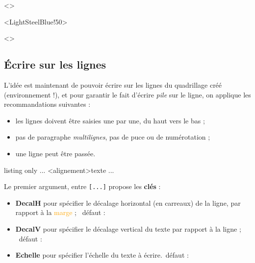 \documentclass[a4paper]{article}
\newcommand\Cle[1]{{\bfseries\sffamily\textlangle #1\textrangle}}
\begin{document}
\medskip

\begin{EnvQuadrillage}[NbCarreaux=18x4,Grille=Seyes,Marge=3]<\CoulSeyes>
\end{EnvQuadrillage}

\smallskip

\begin{EnvQuadrillage}[NbCarreaux=36x8,Elargir=3/3,Cadre]<LightSteelBlue!50>
\end{EnvQuadrillage}

\begin{center}
	\begin{EnvQuadrillage}[NbCarreaux=12x3,Grille=Ruled,Marge=2]<\CoulRuled>
\end{EnvQuadrillage}
\end{center}

\pagebreak

\subsection{Écrire sur les lignes}

L'idée est maintenant de pouvoir écrire sur les lignes du quadrillage créé (environnement !), et pour garantir le fait d'écrire \textit{pile} sur le ligne, on applique les recommandations suivantes :

\begin{itemize}
	\item les lignes doivent être saisies une par une, du \og haut \fg{} vers le \og bas \fg{} ;
	\item pas de paragraphe \textit{multilignes}, pas de puce ou de numérotation ;
	\item une ligne peut être passée.
\end{itemize}

\begin{PresentationCode}{listing only}
...
	\EcrireLigne[clés]<alignement>{texte}
	\PasseLigne
...
\end{PresentationCode}

Le premier argument, entre \texttt{[...]} propose les \Cle{clés} :

\begin{itemize}
	\item \Cle{DecalH} pour spécifier le décalage horizontal (en carreaux) de la ligne, par rapport à la \textcolor{orange}{marge} ; \hfill~défaut : \Cle{0}
	\item \Cle{DecalV} pour spécifier le décalage vertical du texte par rapport à la ligne ; \hfill~défaut : \Cle{0pt}
	\item \Cle{Echelle} pour spécifier l'échelle du texte à écrire.\hfill~défaut : \Cle{1}
\end{itemize}
\end{document}
